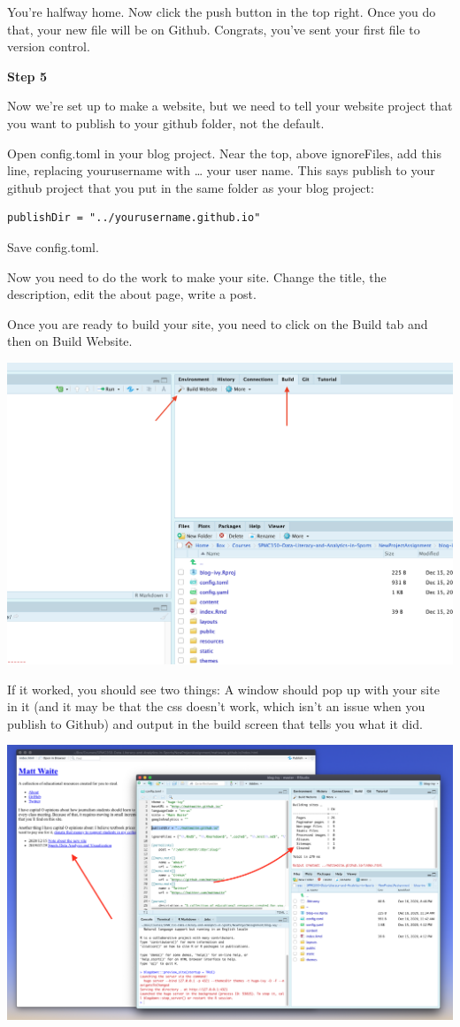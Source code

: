 \documentclass[
]{book}
\begin{document}
You're halfway home. Now click the push button in the top right. Once you do that, your new file will be on Github. Congrats, you've sent your first file to version control.

\textbf{Step 5}

Now we're set up to make a website, but we need to tell your website project that you want to publish to your github folder, not the default.

Open config.toml in your blog project. Near the top, above ignoreFiles, add this line, replacing yourusername with \ldots{} your user name. This says publish to your github project that you put in the same folder as your blog project:

\begin{verbatim}
publishDir = "../yourusername.github.io"
\end{verbatim}

Save config.toml.

Now you need to do the work to make your site. Change the title, the description, edit the about page, write a post.

Once you are ready to build your site, you need to click on the Build tab and then on Build Website.

\includegraphics[width=29.03in]{images/blog8}

If it worked, you should see two things: A window should pop up with your site in it (and it may be that the css doesn't work, which isn't an issue when you publish to Github) and output in the build screen that tells you what it did.

\includegraphics[width=24.44in]{images/blog14}
\end{document}
